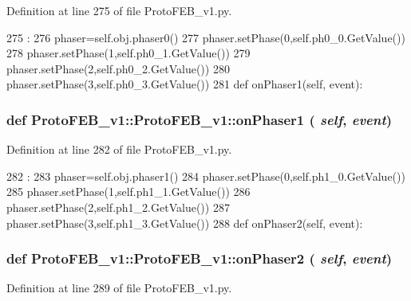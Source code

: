 Definition at line 275 of file ProtoFEB\_\-v1.py.


\begin{DoxyCode}
275                               :
276         phaser=self.obj.phaser0()
277         phaser.setPhase(0,self.ph0_0.GetValue())
278         phaser.setPhase(1,self.ph0_1.GetValue())
279         phaser.setPhase(2,self.ph0_2.GetValue())
280         phaser.setPhase(3,self.ph0_3.GetValue())
281 
    def onPhaser1(self, event):
\end{DoxyCode}
\hypertarget{classProtoFEB__v1_1_1ProtoFEB__v1_a91ed23669163e4db426f42b920a90b78}{
\subsubsection[{onPhaser1}]{\setlength{\rightskip}{0pt plus 5cm}def ProtoFEB\_\-v1::ProtoFEB\_\-v1::onPhaser1 ( {\em self}, \/   {\em event})}}
\label{classProtoFEB__v1_1_1ProtoFEB__v1_a91ed23669163e4db426f42b920a90b78}


Definition at line 282 of file ProtoFEB\_\-v1.py.


\begin{DoxyCode}
282                               :
283         phaser=self.obj.phaser1()
284         phaser.setPhase(0,self.ph1_0.GetValue())
285         phaser.setPhase(1,self.ph1_1.GetValue())
286         phaser.setPhase(2,self.ph1_2.GetValue())
287         phaser.setPhase(3,self.ph1_3.GetValue())
288 
    def onPhaser2(self, event):
\end{DoxyCode}
\hypertarget{classProtoFEB__v1_1_1ProtoFEB__v1_a33679895ccabf2f476a5b3a8fc004f73}{
\subsubsection[{onPhaser2}]{\setlength{\rightskip}{0pt plus 5cm}def ProtoFEB\_\-v1::ProtoFEB\_\-v1::onPhaser2 ( {\em self}, \/   {\em event})}}
\label{classProtoFEB__v1_1_1ProtoFEB__v1_a33679895ccabf2f476a5b3a8fc004f73}


Definition at line 289 of file ProtoFEB\_\-v1.py.


